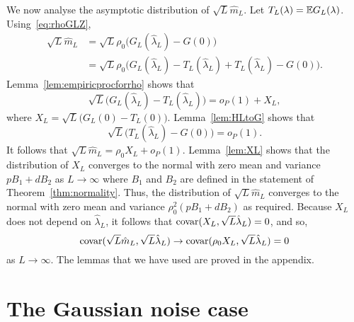 \documentclass[journal]{IEEEtran}
\begin{document}
We now analyse the asymptotic distribution of $\sqrt{L} \hat{m}_L$.  Let $T_L(\lambda) = {\mathbb E} G_L(\lambda)$.  Using~\eqref{eq:rhoGLZ},
\begin{align*}
\sqrt{L} \hat{m}_L &= \sqrt{L} \rho_0 \big( G_L(\hat{\lambda}_L) - G(0) \big) \\
&= \sqrt{L} \rho_0 \big( G_L(\hat{\lambda}_L) - T_L(\hat{\lambda}_L) + T_L(\hat{\lambda}_L) - G(0) \big).
\end{align*}
Lemma~\ref{lem:empiricprocforrho} shows that 
\[
\sqrt{L}\big( G_L(\hat{\lambda}_L) - T_L(\hat{\lambda}_L)  \big) = o_P(1) + X_L,
\]
where $X_L = \sqrt{L}\big( G_L(0) - T_L(0)  \big)$.  Lemma~\ref{lem:HLtoG} shows that
\[
\sqrt{L}\big( T_L(\hat{\lambda}_L) - G(0) \big) = o_P(1).
\]
It follows that $\sqrt{L} \hat{m}_L =  \rho_0 X_L + o_P(1)$.  Lemma~\ref{lem:XL} shows that the distribution of $X_L$ converges to the normal with zero mean and variance $p B_1 + d B_2$ as $L\rightarrow\infty$ where $B_1$ and $B_2$ are defined in the statement of Theorem~\ref{thm:normality}.  Thus, the distribution of $\sqrt{L} \hat{m}_L$ converges to the normal with zero mean and variance $\rho_0^2(p B_1 + d B_2)$ as required.  Because $X_L$ does not depend on $\hat{\lambda}_L$, it follows that $\operatorname{covar}(X_L, \sqrt{L}\hat{\lambda}_L) = 0$, and so,
\[
\operatorname{covar}(\sqrt{L}\hat{m}_L, \sqrt{L}\hat{\lambda}_L) \rightarrow \operatorname{covar}(\rho_0 X_L, \sqrt{L}\hat{\lambda}_L) = 0
\]
as $L \rightarrow \infty$.  The lemmas that we have used are proved in the appendix.



\section{The Gaussian noise case}\label{sec:gaussian-noise-case}
\end{document}
